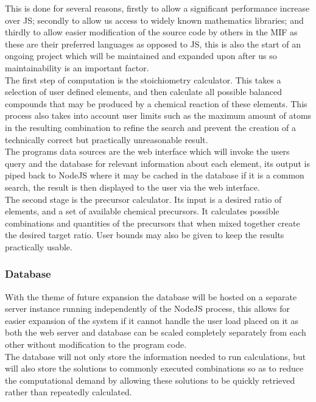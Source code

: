 This is done for several reasons, firstly to allow a significant performance increase over JS; secondly to allow us access to widely known mathematics libraries; and thirdly to allow easier modification of the source code by others in the MIF as these are their preferred languages as opposed to JS, this is also the start of an ongoing project which will be maintained and expanded upon after us so maintainability is an important factor. \\

The first step of computation is the stoichiometry calculator. This takes a selection of user defined elements, and then calculate all possible balanced compounds that may be produced by a chemical reaction of these elements. This process also takes into account user limits such as the maximum amount of atoms in the resulting combination to refine the search and prevent the creation of a technically correct but practically unreasonable result. \\

The programs data sources are the web interface which will invoke the users query and the database for relevant information about each element, its output is piped back to NodeJS where it may be cached in the database if it is a common search, the result is then displayed to the user via the web interface. \\

The second stage is the precursor calculator. Its input is a desired ratio of elements, and a set of available chemical precursors. It calculates possible combinations and quantities of the precursors that when mixed together create the desired target ratio. User bounds may also be given to keep the results practically usable.


\subsubsection{Database}
With the theme of future expansion the database will be hosted on a separate server instance running independently of the NodeJS process, this allows for easier expansion of the system if it cannot handle the user load placed on it as both the web server and database can be scaled completely separately from each other without modification to the program code. \\ 

The database will not only store the information needed to run calculations, but will also store the solutions to commonly executed combinations so as to reduce the computational demand by allowing these solutions to be quickly retrieved rather than repeatedly calculated.

